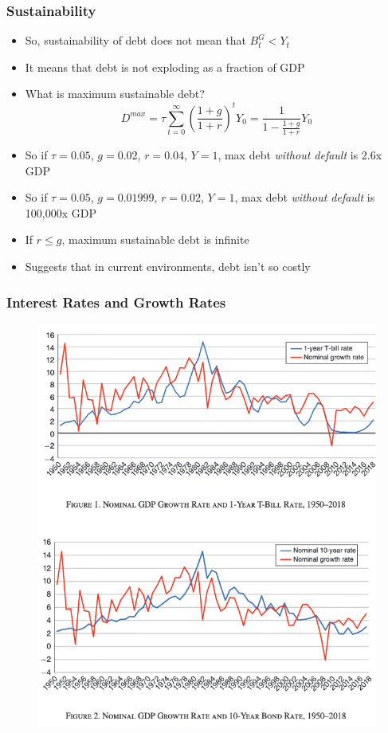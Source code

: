 \documentclass{beamer}
\begin{document}
\begin{frame}
\frametitle{Sustainability}
\begin{itemize}
\item So, sustainability of debt does not mean that $B_t^G<Y_t$
\bigskip
\item It means that debt is not exploding as a fraction of GDP
\bigskip
\item What is maximum sustainable debt?
$$D^{max}=\tau\sum_{t=0}^\infty\left(\frac{1+g}{1+r}\right)^tY_0=\frac{1}{1-\frac{1+g}{1+r}}Y_0$$
\item So if $\tau=0.05$, $g=0.02$, $r=0.04$, $Y=1$, max debt \emph{without default }is 2.6x GDP
\item So if $\tau=0.05$, $g=0.01999$, $r=0.02$, $Y=1$, max debt \emph{without default }is 100,000x GDP
\item If $r\leq g$, maximum sustainable debt is infinite
\item Suggests that in current environments, debt isn't so costly
\end{itemize}
\end{frame}


\begin{frame}
\frametitle{Interest Rates and Growth Rates}
\begin{figure}
\includegraphics[scale=0.3]{Blanchard1.png}
\end{figure}
\end{frame}
\end{document}
